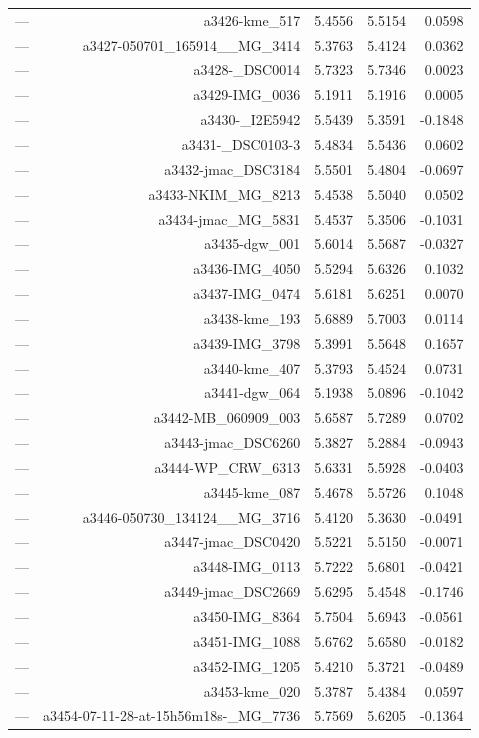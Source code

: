 \begin{table}[htbp]
\begin{tabular}{lrrrr}
— & a3426-kme_517 & 5.4556 & 5.5154 & 0.0598 \\
— & a3427-050701_165914__MG_3414 & 5.3763 & 5.4124 & 0.0362 \\
— & a3428-_DSC0014 & 5.7323 & 5.7346 & 0.0023 \\
— & a3429-IMG_0036 & 5.1911 & 5.1916 & 0.0005 \\
— & a3430-_I2E5942 & 5.5439 & 5.3591 & -0.1848 \\
— & a3431-_DSC0103-3 & 5.4834 & 5.5436 & 0.0602 \\
— & a3432-jmac_DSC3184 & 5.5501 & 5.4804 & -0.0697 \\
— & a3433-NKIM_MG_8213 & 5.4538 & 5.5040 & 0.0502 \\
— & a3434-jmac_MG_5831 & 5.4537 & 5.3506 & -0.1031 \\
— & a3435-dgw_001 & 5.6014 & 5.5687 & -0.0327 \\
— & a3436-IMG_4050 & 5.5294 & 5.6326 & 0.1032 \\
— & a3437-IMG_0474 & 5.6181 & 5.6251 & 0.0070 \\
— & a3438-kme_193 & 5.6889 & 5.7003 & 0.0114 \\
— & a3439-IMG_3798 & 5.3991 & 5.5648 & 0.1657 \\
— & a3440-kme_407 & 5.3793 & 5.4524 & 0.0731 \\
— & a3441-dgw_064 & 5.1938 & 5.0896 & -0.1042 \\
— & a3442-MB_060909_003 & 5.6587 & 5.7289 & 0.0702 \\
— & a3443-jmac_DSC6260 & 5.3827 & 5.2884 & -0.0943 \\
— & a3444-WP_CRW_6313 & 5.6331 & 5.5928 & -0.0403 \\
— & a3445-kme_087 & 5.4678 & 5.5726 & 0.1048 \\
— & a3446-050730_134124__MG_3716 & 5.4120 & 5.3630 & -0.0491 \\
— & a3447-jmac_DSC0420 & 5.5221 & 5.5150 & -0.0071 \\
— & a3448-IMG_0113 & 5.7222 & 5.6801 & -0.0421 \\
— & a3449-jmac_DSC2669 & 5.6295 & 5.4548 & -0.1746 \\
— & a3450-IMG_8364 & 5.7504 & 5.6943 & -0.0561 \\
— & a3451-IMG_1088 & 5.6762 & 5.6580 & -0.0182 \\
— & a3452-IMG_1205 & 5.4210 & 5.3721 & -0.0489 \\
— & a3453-kme_020 & 5.3787 & 5.4384 & 0.0597 \\
— & a3454-07-11-28-at-15h56m18s-_MG_7736 & 5.7569 & 5.6205 & -0.1364 \\

\end{tabular}
\end{table}
